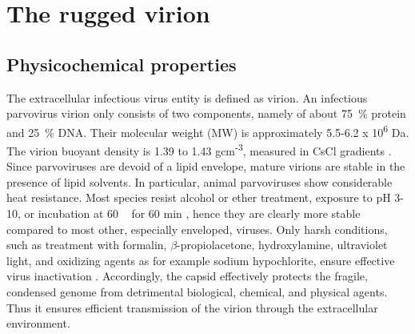
\chapter{The rugged virion} %

\label{Chapter4} %




\section{Physicochemical properties}
The extracellular infectious virus entity is defined as virion. An infectious parvovirus virion only consists of two components, namely of about 75~\% protein and 25~\% DNA. Their molecular weight (MW) is approximately 5.5-6.2 x 10\textsuperscript{6} Da. The virion buoyant density is 1.39 to 1.43 gcm\textsuperscript{-3}, measured in CsCl gradients \cite{CsCl, pmid4317344}. Since parvoviruses are devoid of a lipid envelope, mature virions are stable in the presence of lipid solvents. In particular, animal parvoviruses show considerable heat resistance. Most species resist alcohol or ether treatment, exposure to pH 3-10, or incubation at 60 \textcelsius~ for 60 min \cite{pmid12935806, pmid12385412, pmid17880601, pmid19039515, pmid14660623, pmid10941577, pmid10662625}, hence they are clearly more stable compared to most other, especially enveloped, viruses. Only harsh conditions, such as treatment with formalin, $\beta$-propiolacetone, hydroxylamine, ultraviolet light, and oxidizing agents as for example sodium hypochlorite, ensure effective virus inactivation \cite{pmid4213983, pmid3416941, pmid7848502, pmid1520981}. Accordingly, the capsid effectively protects the fragile, condensed genome from detrimental biological, chemical, and physical agents. Thus it ensures efficient transmission of the virion through the extracellular environment.     

